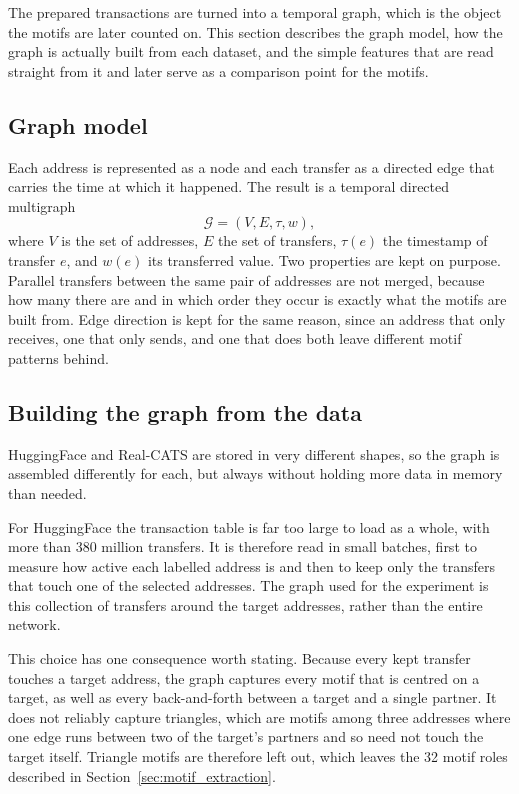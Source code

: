 \documentclass{thesisclass}
\begin{document}
The prepared transactions are turned into a temporal graph, which is the object
the motifs are later counted on. This section describes the graph model, how the
graph is actually built from each dataset, and the simple features that are read
straight from it and later serve as a comparison point for the motifs.

\subsection{Graph model}

Each address is represented as a node and each transfer as a directed edge that
carries the time at which it happened. The result is a temporal directed
multigraph
\[
  \mathcal{G}=(V,E,\tau,w),
\]
where $V$ is the set of addresses, $E$ the set of transfers, $\tau(e)$ the
timestamp of transfer $e$, and $w(e)$ its transferred value. Two properties are
kept on purpose. Parallel transfers between the same pair of addresses are not
merged, because how many there are and in which order they occur is exactly what
the motifs are built from. Edge direction is kept for the same reason, since an
address that only receives, one that only sends, and one that does both leave
different motif patterns behind.

\subsection{Building the graph from the data}

HuggingFace and Real-CATS are stored in very different shapes, so the graph is
assembled differently for each, but always without holding more data in memory
than needed.

For HuggingFace the transaction table is far too large to load as a whole, with
more than 380 million transfers. It is therefore read in small batches, first to
measure how active each labelled address is and then to keep only the transfers
that touch one of the selected addresses. The graph used for the experiment is
this collection of transfers around the target addresses, rather than the entire
network.

This choice has one consequence worth stating. Because every kept transfer
touches a target address, the graph captures every motif that is centred on a
target, as well as every back-and-forth between a target and a single partner.
It does not reliably capture triangles, which are motifs among three addresses
where one edge runs between two of the target's partners and so need not touch
the target itself. Triangle motifs are therefore left out, which leaves the 32
motif roles described in Section~\ref{sec:motif_extraction}.
\end{document}
